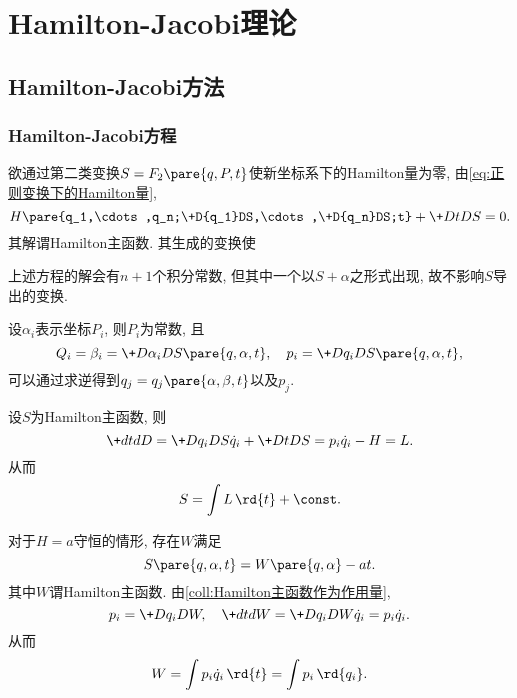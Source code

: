 \documentclass[../TheoreticalMechanics.tex]{subfiles}
\begin{document}
\graphicspath{{HamiltonJacobiTheory/}}

\section{Hamilton-Jacobi理论} %
\label{sec:hamilton_jacobi理论}

\subsection{Hamilton-Jacobi方法} %
\label{sub:hamilton_jacobi方法}

\subsubsection{Hamilton-Jacobi方程} %
\label{ssub:hamilton_jacobi方程}

\begin{finale}
    \begin{theorem}
        欲通过第二类变换$S=F_2\pare{q,P,t}$使新坐标系下的Hamilton量为零, 由\eqref{eq:正则变换下的Hamilton量},
        \[ H\pare{q_1,\cdots,q_n;\+D{q_1}DS,\cdots,\+D{q_n}DS;t} + \+DtDS = 0. \]
        其解谓Hamilton主函数. 其生成的变换使
    \end{theorem}
\end{finale}
\begin{remark}
    上述方程的解会有$n+1$个积分常数, 但其中一个以$S+\alpha$之形式出现, 故不影响$S$导出的变换.
\end{remark}
\begin{corollary}
    设$\alpha_i$表示坐标$P_i$, 则$P_i$为常数, 且
    \[ Q_i = \beta_i = \+D{\alpha_i}D{S\pare{q,\alpha,t}},\quad p_i = \+D{q_i}D{S\pare{q,\alpha,t}}, \]
    可以通过求逆得到$q_j = q_j\pare{\alpha,\beta,t}$以及$p_j$.
\end{corollary}
\begin{corollary}[Hamilton主函数作为作用量]
    \label{coll:Hamilton主函数作为作用量}
    设$S$为Hamilton主函数, 则
    \[ \+dtdD = \+D{q_i}DS\dot{q}_i + \+DtDS = p_i\dot{q}_i - H = L. \]
    从而
    \[ S = \int L\,\rd{t} + \const. \]
\end{corollary}
\begin{corollary}[Hamilton特征函数]
    对于$H=a$守恒的情形, 存在$W$满足
    \[ S\pare{q,\alpha,t} = W\pare{q,\alpha} - at. \]
    其中$W$谓Hamilton主函数. 由\cref{coll:Hamilton主函数作为作用量},
    \[ p_i = \+D{q_i}DW, \quad \+dtdW = \+D{q_i}DW\dot{q}_i = p_i\dot{q}_i. \]
    从而
    \[ W = \int p_i\dot{q}_i\,\rd{t} = \int p_i\,\rd{q_i}. \]
\end{corollary}
\end{document}
